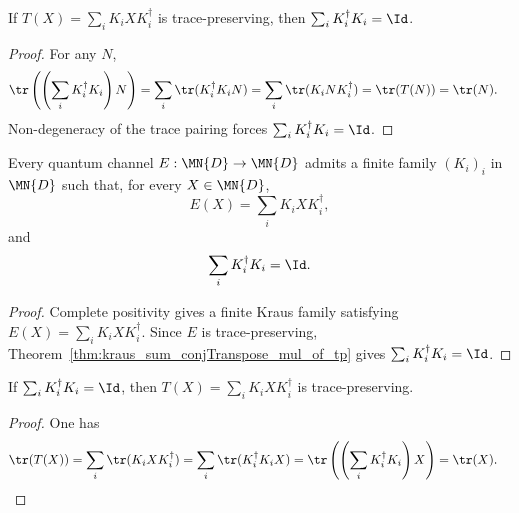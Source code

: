 \begin{theorem}\label{thm:kraus_sum_conjTranspose_mul_of_tp}
    \leanok
    If $T(X) = \sum_i K_i X K_i^\dagger$ is trace-preserving, then
    $\sum_i K_i^\dagger K_i = \Id$.
\end{theorem}

\begin{proof}
    \leanok
    For any $N$,
    \begin{align}
        \tr\left(\left(\sum_i K_i^\dagger K_i\right)N\right)
        &= \sum_i \tr(K_i^\dagger K_i N)
         = \sum_i \tr(K_i N K_i^\dagger)
         = \tr(T(N))
         = \tr(N).
        \notag
    \end{align}
    Non-degeneracy of the trace pairing forces
    $\sum_i K_i^\dagger K_i = \Id$.
\end{proof}

\begin{theorem}
    \label{thm:exists_kraus_map_eq_and_normalized}
    \leanok
    Every quantum channel $E : \MN{D} \to \MN{D}$ admits a finite family
    $(K_i)_i$ in $\MN{D}$ such that, for every $X \in \MN{D}$,
    \[
        E(X)=\sum_i K_i X K_i^\dagger,
    \]
    and
    \[
        \sum_i K_i^\dagger K_i=\Id.
    \]
\end{theorem}

\begin{proof}
    \leanok
    Complete positivity gives a finite Kraus family satisfying
    $E(X)=\sum_i K_i X K_i^\dagger$. Since $E$ is trace-preserving,
    Theorem~\ref{thm:kraus_sum_conjTranspose_mul_of_tp} gives
    $\sum_i K_i^\dagger K_i=\Id$.
\end{proof}

\begin{theorem}\label{thm:kraus_tp_of_sum_conjTranspose_mul}
    \leanok
    If $\sum_i K_i^\dagger K_i = \Id$, then
    $T(X) = \sum_i K_i X K_i^\dagger$ is trace-preserving.
\end{theorem}

\begin{proof}
    \leanok
    One has
    \begin{align}
        \tr(T(X))
        &= \sum_i \tr(K_i X K_i^\dagger)
         = \sum_i \tr(K_i^\dagger K_i X)
         = \tr\left(\left(\sum_i K_i^\dagger K_i\right)X\right)
         = \tr(X).
        \notag
    \end{align}
\end{proof}

